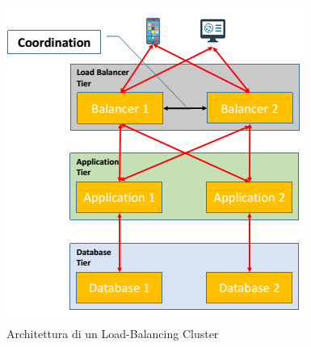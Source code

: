 \documentclass{article}
\begin{document}
\begin{figure}[H]
\centering
\includegraphics[scale=0.6]{img/LBCluster_Arch.png}
\caption{Architettura di un Load-Balancing Cluster}
\end{figure}
\end{document}
